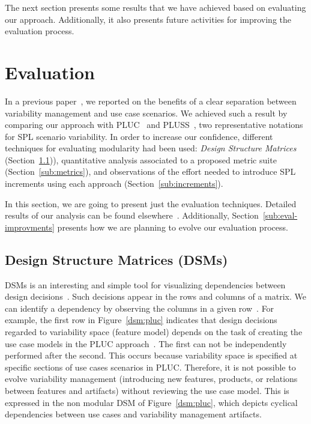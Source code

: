 \documentclass[times, 11pt,twocolumn]{article}
\begin{document}
The next section presents some results that we have achieved based on
evaluating our approach. Additionally, it also presents future activities for
improving the evaluation process.

\section{Evaluation}\label{sec:evaluation}

In a previous paper~\cite{Bonifacio:2008aa}, we reported on the benefits of a
clear separation between variability management and use case scenarios. We
achieved such a result by comparing our approach with
PLUC~\cite{Bertolino:2003aa} and PLUSS~\cite{Eriksson:2005aa}, two representative notations for SPL scenario
variability. In order to increase our confidence, different techniques for
evaluating modularity had been used: \emph{Design Structure Matrices} 
(Section~\ref{sub:dsm})), quantitative analysis associated to a proposed
metric suite (Section~\ref{sub:metrics}), and observations of the
effort needed to introduce SPL increments using each approach (Section~\ref{sub:increments}).

In this section, we are going to present just the evaluation techniques.
Detailed results of our analysis can be found
elsewhere~\cite{Bonifacio:2008aa,Bonifacio:2008ab}. Additionally,
Section~\ref{sub:eval-improvments} presents how we are planning to evolve our evaluation
process.

\subsection{Design Structure Matrices (DSMs)}\label{sub:dsm}

DSMs is an interesting and simple tool for visualizing dependencies between
design decisions~\cite{Baldwin:2000aa}. Such decisions appear in the rows and
columns of a matrix. We can identify a dependency by observing the columns in a
given row~\cite{Baldwin:2000aa}. For example, the first row in
Figure~\ref{dsm:pluc} indicates that design decisions regarded to variability
space (feature model) depends on the task of creating the use case models in the
PLUC approach~\cite{Bertolino:2003aa}. The first can not be independently
performed after the second. This occurs because variability space is specified at
specific sections of use cases scenarios in PLUC. Therefore, it is not possible
to evolve variability management (introducing new features, products, or
relations between features and artifacts) without reviewing the use case model.
This is expressed in the non modular DSM of Figure~\ref{dsm:pluc}, which depicts
cyclical dependencies between use cases and variability management artifacts.
\end{document}
